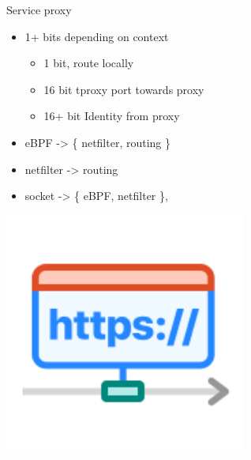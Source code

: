 \documentclass[black,white,aspectratio=169]{beamer}
\DeclareRobustCommand{\#}{\adjustbox{valign=B,totalheight=.57\baselineskip}{\oldhash}}%
\begin{document}
    \begin{frame}[fragile]{Service proxy}
        \begin{table}
            \begin{subtable}[l]{0.7\textwidth}
        \begin{itemize}
            \item 1+ bits depending on context~\smallskip
            \begin{itemize} %
                \item 1 bit, route locally~\smallskip
                \item 16 bit tproxy port towards proxy~\smallskip
                \item 16+ bit Identity from proxy~\medskip
            \end{itemize}
            \item eBPF -> \{ netfilter, routing \}
            \item netfilter -> routing
            \item socket -> \{ eBPF, netfilter \},
        \end{itemize}
            \end{subtable}
            \begin{subtable}[r]{0.2\textwidth}
                \includegraphics[width=0.6\textwidth]{proxy.png}
            \end{subtable}
        \end{table}
    \end{frame}
\end{document}
